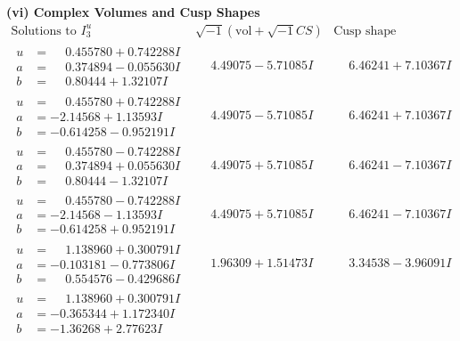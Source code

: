 \documentclass[1p]{elsarticle_modified}
\theoremstyle{definition}
\newcommand{\I}{\sqrt{-1}}
\begin{document}
\newpage\flushleft \textbf{(vi) Complex Volumes and Cusp Shapes}
$$\begin{array}{c|c|c}  
\text{Solutions to }I^u_{3}& \I (\text{vol} + \sqrt{-1}CS) & \text{Cusp shape}\\
 \hline 
\begin{aligned}
u &= \phantom{-}0.455780 + 0.742288 I \\
a &= \phantom{-}0.374894 - 0.055630 I \\
b &= \phantom{-}0.80444 + 1.32107 I\end{aligned}
 & \phantom{-}4.49075 - 5.71085 I & \phantom{-}6.46241 + 7.10367 I \\ \hline\begin{aligned}
u &= \phantom{-}0.455780 + 0.742288 I \\
a &= -2.14568 + 1.13593 I \\
b &= -0.614258 - 0.952191 I\end{aligned}
 & \phantom{-}4.49075 - 5.71085 I & \phantom{-}6.46241 + 7.10367 I \\ \hline\begin{aligned}
u &= \phantom{-}0.455780 - 0.742288 I \\
a &= \phantom{-}0.374894 + 0.055630 I \\
b &= \phantom{-}0.80444 - 1.32107 I\end{aligned}
 & \phantom{-}4.49075 + 5.71085 I & \phantom{-}6.46241 - 7.10367 I \\ \hline\begin{aligned}
u &= \phantom{-}0.455780 - 0.742288 I \\
a &= -2.14568 - 1.13593 I \\
b &= -0.614258 + 0.952191 I\end{aligned}
 & \phantom{-}4.49075 + 5.71085 I & \phantom{-}6.46241 - 7.10367 I \\ \hline\begin{aligned}
u &= \phantom{-}1.138960 + 0.300791 I \\
a &= -0.103181 - 0.773806 I \\
b &= \phantom{-}0.554576 - 0.429686 I\end{aligned}
 & \phantom{-}1.96309 + 1.51473 I & \phantom{-}3.34538 - 3.96091 I \\ \hline\begin{aligned}
u &= \phantom{-}1.138960 + 0.300791 I \\
a &= -0.365344 + 1.172340 I \\
b &= -1.36268 + 2.77623 I\end{aligned}

\end{array}$$
\end{document}

